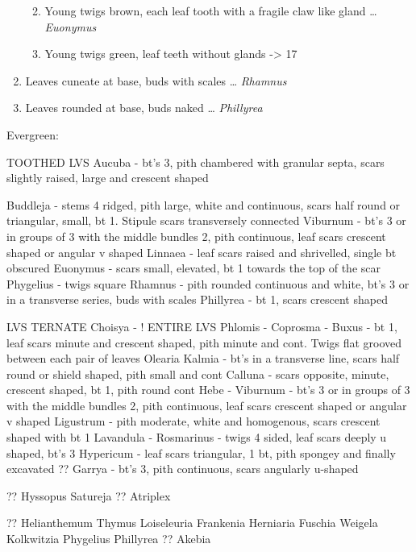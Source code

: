 \documentclass[openany]{book}
\providecommand{\tightlist}{%
  \setlength{\itemsep}{0pt}\setlength{\parskip}{0pt}}
\begin{document}
\begin{enumerate}
  \begin{enumerate}
  \def\labelenumii{\arabic{enumii}.}
  \setcounter{enumii}{14}
  \tightlist
  \item
    Young twigs brown, each leaf tooth with a fragile claw like gland
    \ldots{} \emph{Euonymus}
  \item
    Young twigs green, leaf teeth without glands -\textgreater{} 17
  \end{enumerate}
\item
  Leaves cuneate at base, buds with scales \ldots{} \emph{Rhamnus}
\item
  Leaves rounded at base, buds naked \ldots{} \emph{Phillyrea}
\end{enumerate}

Evergreen:

TOOTHED LVS Aucuba - bt's 3, pith chambered with granular septa, scars
slightly raised, large and crescent shaped

Buddleja - stems 4 ridged, pith large, white and continuous, scars half
round or triangular, small, bt 1. Stipule scars transversely connected
Viburnum - bt's 3 or in groups of 3 with the middle bundles 2, pith
continuous, leaf scars crescent shaped or angular v shaped Linnaea -
leaf scars raised and shrivelled, single bt obscured Euonymus - scars
small, elevated, bt 1 towards the top of the scar Phygelius - twigs
square Rhamnus - pith rounded continuous and white, bt's 3 or in a
transverse series, buds with scales Phillyrea - bt 1, scars crescent
shaped

LVS TERNATE Choisya - ! ENTIRE LVS Phlomis - Coprosma - Buxus - bt 1,
leaf scars minute and crescent shaped, pith minute and cont. Twigs flat
grooved between each pair of leaves Olearia Kalmia - bt's in a
transverse line, scars half round or shield shaped, pith small and cont
Calluna - scars opposite, minute, crescent shaped, bt 1, pith round cont
Hebe - Viburnum - bt's 3 or in groups of 3 with the middle bundles 2,
pith continuous, leaf scars crescent shaped or angular v shaped
Ligustrum - pith moderate, white and homogenous, scars crescent shaped
with bt 1 Lavandula - Rosmarinus - twigs 4 sided, leaf scars deeply u
shaped, bt's 3 Hypericum - leaf scars triangular, 1 bt, pith spongey and
finally excavated ?? Garrya - bt's 3, pith continuous, scars angularly
u-shaped

?? Hyssopus Satureja ?? Atriplex

?? Helianthemum Thymus Loiseleuria Frankenia Herniaria Fuschia Weigela
Kolkwitzia Phygelius Phillyrea ?? Akebia
\end{document}
